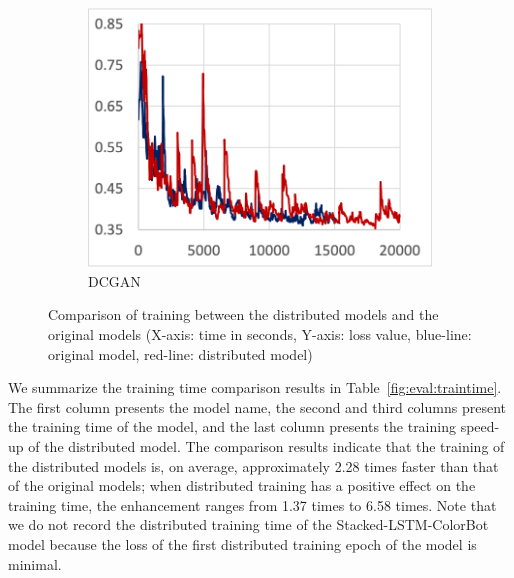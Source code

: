 \begin{figure}[!ht]
  \begin{subfigure}[t]{.22\textwidth}
    \includegraphics[width=\textwidth]{tf2-13}
    \caption{\footnotesize DCGAN}
  \end{subfigure} 

  \caption{Comparison of training between the distributed models and the
  original models (X-axis: time in seconds, Y-axis: loss value, blue-line:
  original model, red-line: distributed model)}
  \label{fig:eval:train}
\end{figure}

We summarize the training time comparison results in
Table~\ref{fig:eval:traintime}.
The first column presents the model name, the second and third columns
present the training time of the model, and the last column presents the
training speed-up of the distributed model.
The comparison results indicate that the training of the distributed
models is, on average, approximately 2.28 times faster than that of the
original models; when distributed training has a positive effect on the
training time, the enhancement ranges from 1.37 times to 6.58 times.
Note that we do not record the distributed training time of the
Stacked-LSTM-ColorBot model because the loss of the first distributed training
epoch of the model is minimal.


